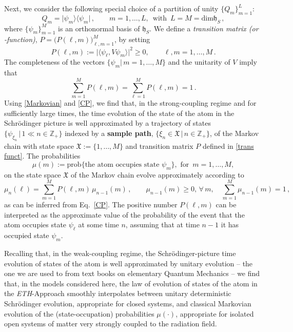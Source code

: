 \documentclass[12pt]{article}
\begin{document}
{Next, we consider the following special choice of a partition of unity $\big\{Q_{m}\big\}_{m=1}^{L}$:
\begin{equation}\label{rank 1}
Q_m = \vert \psi_m \rangle \langle \psi_m \vert\,, \qquad m=1,\dots, L, \,\text{ with }\, L=M=\text{dim}\mathfrak{h}_S\,,
\end{equation}
where $\big\{\psi_m\big\}_{m=1}^{M}$ is an orthonormal basis of $\mathfrak{h}_S$. We define a
\textit{transition matrix (or -function)},
$P=\big(P(\ell, m)\big)_{\ell, m=1}^{M}$, by setting
\begin{equation}\label{trans funct}
P(\ell, m):= \vert \langle \psi_\ell, V \psi_m \rangle \vert^{2} \geq 0, \qquad \ell, m = 1,\dots, M\,.
\end{equation}
The completeness of the vectors $\big\{\psi_m \vert \,m=1,\dots, M\big\}$ and the unitarity of $V$ imply that
\begin{equation}\label{proba}
\sum_{m=1}^{M} P(\ell,m) = \sum_{\ell=1}^{M} P(\ell, m) =1\,.
\end{equation}
Using \eqref{Markovian} and \eqref{CP}, we find that, in the strong-coupling regime and for sufficiently large times,
the time evolution of the state of the atom in the Schr\"odinger picture is well approximated by a trajectory of states
$\big\{ \psi_{\xi_{n}} \,\vert\, 1\ll n\in \mathbb{Z}_{+}\big\}$ indexed by a {\bf{sample path}},
$\big\{\xi_{n} \in \mathfrak{X}\,\vert\, n \in \mathbb{Z}_{+} \big\}$, of the Markov chain with state space
$\mathfrak{X}:=\big\{1, \dots, M\big\}$ and transition matrix $P$ defined in \eqref{trans funct}. The probabilities
$$\mu(m) := \text{prob}\big\{\text{the atom occupies state } \psi_m\big\}, \text{ for }\,m=1,\dots, M,$$
on the state space $\mathfrak{X}$ of the Markov chain evolve approximately according to
\begin{equation}\label{Markov chain}
\mu_{n}(\ell)= \sum_{m=1}^{M} P(\ell, m)\, \mu_{n-1}(m)\,, \qquad \mu_{n-1}(m)\geq 0, \, \forall\, m, \quad \sum_{m=1}^{M}\mu_{n-1}(m)=1\,,
\end{equation}
as can be inferred from Eq.~\eqref{CP}. The positive number $P(\ell, m)$ can be interpreted as the approximate value
of the probability of the event that the atom occupies state $\psi_{\ell}$ at some time $n$, assuming that at time $n-1$
it has occupied state $\psi_{m}$.

Recalling that, in the weak-coupling regime, the Schr\"odinger-picture time evolution of states of the
atom is well approximated by unitary evolution -- the one we are used to from text books on elementary Quantum
Mechanics -- we find that, in the models considered here, the law of evolution of states of the atom in the \textit{ETH}-Approach
smoothly interpolates between unitary deterministic Schr\"odinger evolution, appropriate for closed systems, and classical
Markovian evolution of the (state-occupation) probabilities $\mu(\cdot)$, appropriate for isolated open systems of matter very strongly coupled to the radiation field.\\

}
\end{document}
